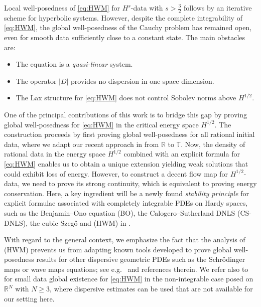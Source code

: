 \documentclass[10pt,reqno,a4paper]{amsart}
\theoremstyle{definition}
\theoremstyle{remark}
\theoremstyle{remark}
\numberwithin{equation}{section}
\newcommand{\R}{\mathbb{R}}
\newcommand{\T}{\mathbb{T}}
\begin{document}
Local well-posedness of \eqref{eq:HWM} for $H^s$-data with $s > \frac{3}{2}$ follows by an iterative scheme for hyperbolic systems. However, despite the complete integrability of \eqref{eq:HWM}, the global well-posedness of the Cauchy problem has remained open, even for smooth data sufficiently close to a constant state. The main obstacles are:
\begin{itemize}
\item The equation is a {\em quasi-linear} system. 
\item The operator $|D|$ provides no dispersion in one space dimension.
\item The Lax structure for \eqref{eq:HWM} does not control Sobolev norms above $H^{1/2}$.
\end{itemize}

One of the principal contributions of this work is to bridge this gap by proving global well-posedness for \eqref{eq:HWM} in the critical energy space $H^{1/2}$. The construction proceeds by first proving global well-posedness for all rational initial data, where we adapt our recent approach in \cite{GeLe-25} from $\R$ to $\T$. Now, the density of rational data in the energy space $H^{1/2}$ combined with an explicit formula for \eqref{eq:HWM} enables us to obtain a unique extension yielding weak solutions that could exhibit loss of energy. However, to construct a decent flow map for $H^{1/2}$-data, we need to prove its strong continuity, which is equivalent to proving energy conservation.  Here, a key ingredient will be a newly found {\em stability principle} for explicit formulae associated with completely integrable PDEs on Hardy spaces, such as the Benjamin--Ono equation (BO), the Calogero--Sutherland DNLS (CS-DNLS), the cubic Szeg\H{o} and (HWM) in \cite{Ge-23, Ge-24, GeLe-25, GePu-23, Ba-24, KiLaVi-24, KiLaVi-25, GaGeMi-26, Xi-25, Ma-25}. 

With regard to the general context, we emphasize the fact that the analysis of (HWM) prevents us from adapting known tools developed to prove global well-posedness results for other dispersive geometric PDEs such as the Schr\"odinger maps or wave maps equations; see e.g.~\cite{Ta-06,KotaVi-14} and references therein. We refer also to \cite{KrSi-18, KiKr-21, Li-23} for small data global existence for \eqref{eq:HWM} in the non-integrable case posed on $\R^N$ with $N \geq 3$, where dispersive estimates can be used that are not available for our setting here. 
\end{document}
